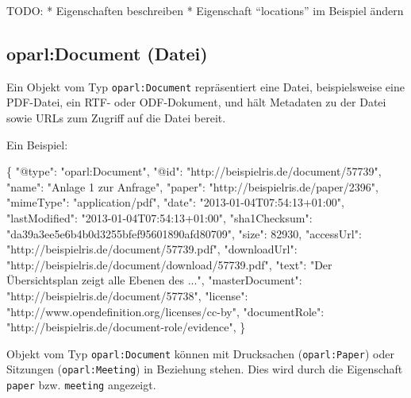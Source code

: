 \documentclass[,a4paper]{article}
\newenvironment{Shaded}{}{}
\newcommand{\DataTypeTok}[1]{\textcolor[rgb]{0.56,0.13,0.00}{{#1}}}
\newcommand{\DecValTok}[1]{\textcolor[rgb]{0.25,0.63,0.44}{{#1}}}
\newcommand{\StringTok}[1]{\textcolor[rgb]{0.25,0.44,0.63}{{#1}}}
\newcommand{\NormalTok}[1]{{#1}}
\begin{document}
TODO: * Eigenschaften beschreiben * Eigenschaft ``locations'' im
Beispiel ändern

\subsection{oparl:Document (Datei)}\label{oparlux5fdocument}

Ein Objekt vom Typ \texttt{oparl:Document} repräsentiert eine Datei,
beispielsweise eine PDF-Datei, ein RTF- oder ODF-Dokument, und hält
Metadaten zu der Datei sowie URLs zum Zugriff auf die Datei bereit.

Ein Beispiel:

\begin{Shaded}
\begin{Highlighting}[]
\NormalTok{\{}
    \DataTypeTok{"@type"}\NormalTok{: }\StringTok{"oparl:Document"}\NormalTok{,}
    \DataTypeTok{"@id"}\NormalTok{: }\StringTok{"http://beispielris.de/document/57739"}\NormalTok{,}
    \DataTypeTok{"name"}\NormalTok{: }\StringTok{"Anlage 1 zur Anfrage"}\NormalTok{,}
    \DataTypeTok{"paper"}\NormalTok{: }\StringTok{"http://beispielris.de/paper/2396"}\NormalTok{,}
    \DataTypeTok{"mimeType"}\NormalTok{: }\StringTok{"application/pdf"}\NormalTok{,}
    \DataTypeTok{"date"}\NormalTok{: }\StringTok{"2013-01-04T07:54:13+01:00"}\NormalTok{,}
    \DataTypeTok{"lastModified"}\NormalTok{: }\StringTok{"2013-01-04T07:54:13+01:00"}\NormalTok{,}
    \DataTypeTok{"sha1Checksum"}\NormalTok{: }\StringTok{"da39a3ee5e6b4b0d3255bfef95601890afd80709"}\NormalTok{,}
    \DataTypeTok{"size"}\NormalTok{: }\DecValTok{82930}\NormalTok{,}
    \DataTypeTok{"accessUrl"}\NormalTok{: }\StringTok{"http://beispielris.de/document/57739.pdf"}\NormalTok{,}
    \DataTypeTok{"downloadUrl"}\NormalTok{: }\StringTok{"http://beispielris.de/document/download/57739.pdf"}\NormalTok{,}
    \DataTypeTok{"text"}\NormalTok{: }\StringTok{"Der Übersichtsplan zeigt alle Ebenen des ..."}\NormalTok{,}
    \DataTypeTok{"masterDocument"}\NormalTok{: }\StringTok{"http://beispielris.de/document/57738"}\NormalTok{,}
    \DataTypeTok{"license"}\NormalTok{: }\StringTok{"http://www.opendefinition.org/licenses/cc-by"}\NormalTok{,}
    \DataTypeTok{"documentRole"}\NormalTok{: }\StringTok{"http://beispielris.de/document-role/evidence"}\NormalTok{,}
\NormalTok{\}}
\end{Highlighting}
\end{Shaded}

Objekt vom Typ \texttt{oparl:Document} können mit Drucksachen
(\texttt{oparl:Paper}) oder Sitzungen (\texttt{oparl:Meeting}) in
Beziehung stehen. Dies wird durch die Eigenschaft \texttt{paper} bzw.
\texttt{meeting} angezeigt.
\end{document}
